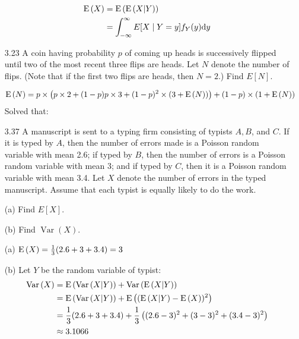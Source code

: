 \documentclass[en,hazy,blue,12pt,device = normal]{elegantnote}
\begin{document}
\begin{enumerate}
    \begin{tcolorbox}
        \sol
        \begin{align*}
            \operatorname E\left(X\right) &= \operatorname E\left(\operatorname E\left(X|Y\right)\right)\\
            &=\int_{-\infty}^{\infty} E[X \mid Y=y] f_Y(y) \text{d} y
        \end{align*}
    \end{tcolorbox}

    \item[3.23]A coin having probability $p$ of coming up heads is successively flipped until two of the most recent three flips are heads. Let $N$ denote the number of flips. (Note that if the first two flips are heads, then $N=2$.) Find $E[N]$.
    \begin{tcolorbox}
        \sol
        \begin{align*}
            \operatorname E\left(N\right) &= p\times\left(p \times 2 + (1-p) p\times 3 + (1-p)^2 \times (3+\operatorname E\left(N\right)) \right) + (1-p) \times (1+\operatorname E\left(N\right))
        \end{align*}
        Solved that:
    \end{tcolorbox}

    \item[3.37]A manuscript is sent to a typing firm consisting of typists $A, B$, and $C$. If it is typed by $A$, then the number of errors made is a Poisson random variable with mean 2.6; if typed by $B$, then the number of errors is a Poisson random variable with mean 3; and if typed by $C$, then it is a Poisson random variable with mean 3.4. Let $X$ denote the number of errors in the typed manuscript. Assume that each typist is equally likely to do the work.
    
    (a) Find $E[X]$.

    (b) Find $\operatorname{Var}(X)$.

    \begin{tcolorbox}
        \sol

        (a) \(\operatorname E\left(X\right) = \frac 1 3 (2.6+3+3.4) = 3\)

        (b) Let \(Y\) be the random variable of typist:
        \begin{align*}
            \operatorname{Var}\left(X\right) &= \operatorname E\left(\operatorname{Var}\left(X|Y\right)\right) + \operatorname{Var}\left(\operatorname E\left(X|Y\right)\right)\\
            &= \operatorname E\left(\operatorname{Var}\left(X|Y\right)\right)+ \operatorname E\left((\operatorname E\left(X|Y\right) - \operatorname E\left(X\right))^2\right)\\
            &= \frac 1 3 (2.6+3+3.4) + \frac 1 3 \left((2.6-3)^2+ (3-3)^2 + (3.4-3)^2\right)\\
            &\approx 3.1066
        \end{align*}
    \end{tcolorbox}


\end{enumerate}
\end{document}
